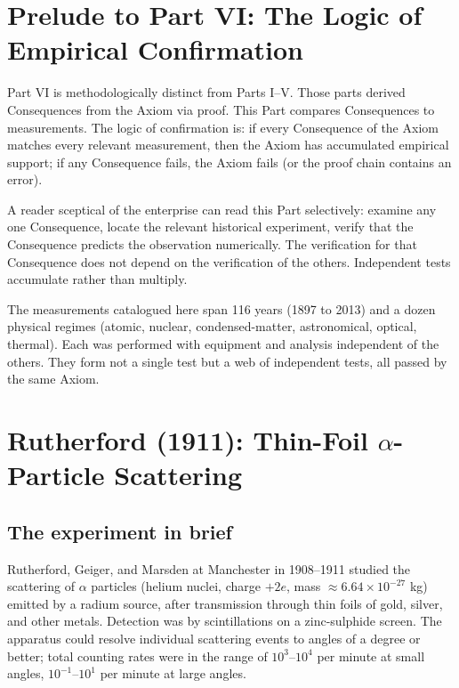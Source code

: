 \documentclass[11pt,twocolumn,a4paper]{article}
\theoremstyle{axiomstyle}
\theoremstyle{conseqstyle}
\theoremstyle{definition}
\theoremstyle{remark}
\begin{document}
\section*{Prelude to Part VI: The Logic of Empirical Confirmation}

Part VI is methodologically distinct from Parts I--V. Those parts derived Consequences from the Axiom via proof. This Part compares Consequences to measurements. The logic of confirmation is: if every Consequence of the Axiom matches every relevant measurement, then the Axiom has accumulated empirical support; if any Consequence fails, the Axiom fails (or the proof chain contains an error).

A reader sceptical of the enterprise can read this Part selectively: examine any one Consequence, locate the relevant historical experiment, verify that the Consequence predicts the observation numerically. The verification for that Consequence does not depend on the verification of the others. Independent tests accumulate rather than multiply.

The measurements catalogued here span 116 years (1897 to 2013) and a dozen physical regimes (atomic, nuclear, condensed-matter, astronomical, optical, thermal). Each was performed with equipment and analysis independent of the others. They form not a single test but a web of independent tests, all passed by the same Axiom.

\section{Rutherford (1911): Thin-Foil \texorpdfstring{$\alpha$}{alpha}-Particle Scattering}
\label{sec:rutherford}

\subsection{The experiment in brief}

Rutherford, Geiger, and Marsden at Manchester in 1908--1911 studied the scattering of $\alpha$ particles (helium nuclei, charge $+2e$, mass $\approx 6.64\times 10^{-27}$ kg) emitted by a radium source, after transmission through thin foils of gold, silver, and other metals. Detection was by scintillations on a zinc-sulphide screen. The apparatus could resolve individual scattering events to angles of a degree or better; total counting rates were in the range of $10^{3}$--$10^{4}$ per minute at small angles, $10^{-1}$--$10^{1}$ per minute at large angles.
\end{document}
